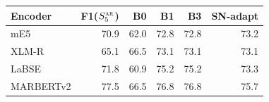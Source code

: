 \begin{tabular}{@{}lrrrrr@{}}\toprule
Encoder & F1($S_5^{\textsc{ar}}$) & B0 & B1 & B3 & SN-adapt\\\midrule
mE5 & 70.9 & 62.0 & 72.8 & 72.8 & 73.2\\
XLM-R & 65.1 & 66.5 & 73.1 & 73.1 & 73.1\\
LaBSE & 71.8 & 60.9 & 75.2 & 75.2 & 73.3\\
MARBERTv2 & 77.5 & 66.5 & 76.8 & 76.8 & 75.7\\
\bottomrule\end{tabular}
